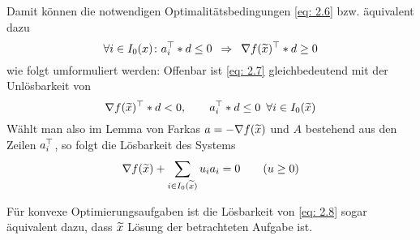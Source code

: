 Damit können die notwendigen Optimalitätsbedingungen \eqref{eq: 2.6} bzw. äquivalent dazu
\begin{equation}
	\forall i \in I_0(x) \colon a_i^{\top} * d \le 0 \enskip \Rightarrow \enskip \nabla f(\widetilde{x})^{\top} * d \ge 0 \label{eq: 2.7}
\end{equation}
wie folgt umformuliert werden: Offenbar ist \eqref{eq: 2.7} gleichbedeutend mit der Unlösbarkeit von 
\begin{equation*}
	\nabla f(\widetilde{x})^{\top} * d < 0, \qquad a_i^{\top} * d \le 0 \enskip \forall i \in I_0(\widetilde{x})
\end{equation*}
Wählt man also im Lemma von Farkas $a = - \nabla f(\widetilde{x})$ und $A$ bestehend aus den Zeilen $a_i^{\top}$, so folgt die Lösbarkeit des Systems
\begin{equation}
	\nabla f(\widetilde{x}) + \sum_{i \in I_0(\widetilde{x})} u_i a_i = 0 \qquad (u \ge 0) \label{eq: 2.8}
\end{equation}

Für konvexe Optimierungsaufgaben ist die Lösbarkeit von \eqref{eq: 2.8} sogar äquivalent dazu, dass $\widetilde{x}$ Lösung der betrachteten Aufgabe ist.